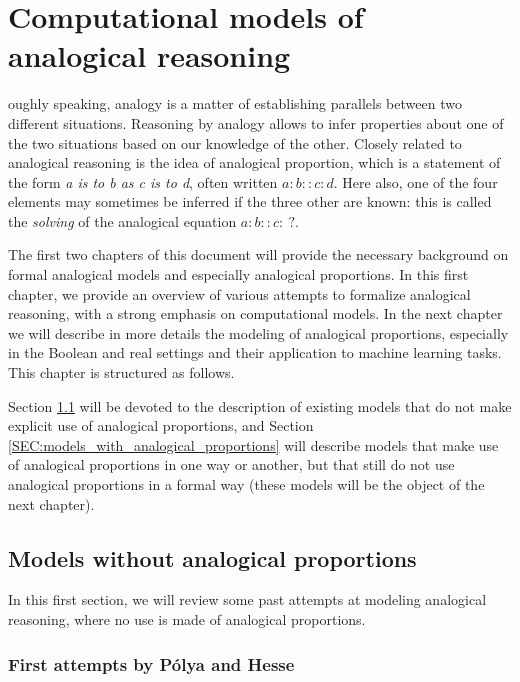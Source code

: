 \chapter{Computational models of analogical reasoning}
\label{CHAP:computational_models_of_analogical_reasoning}
\renewcommand{\contentsname}{Content}
\localtableofcontents*
\vspace*{\baselineskip}

oughly speaking, analogy is a matter of establishing parallels
between two different situations. Reasoning by analogy allows to infer
properties about one of the two situations based on our knowledge of the other.
Closely related to analogical reasoning is the idea of analogical proportion,
which is a statement of the form \textit{a is to b as c is to d}, often written
$a:b::c:d$. Here also, one of the four elements may sometimes be inferred if
the three other are known: this is called the \textit{solving} of the
analogical equation $a:b::c:~?$.

The first two chapters of this document will provide the necessary background
on formal analogical models and especially analogical proportions. In this
first chapter, we provide an overview of various attempts to formalize
analogical reasoning, with a strong emphasis on computational models. In the
next chapter we will describe in more details the modeling of analogical
proportions, especially in the Boolean and real settings and their application
to machine learning tasks. This chapter is structured as follows.

Section \ref{SEC:models_without_proportions} will be devoted to the description
of existing models that do not make explicit use of analogical proportions, and
Section \ref{SEC:models_with_analogical_proportions} will describe models that
make use of analogical proportions in one way or another, but that still do not
use analogical proportions in a formal way (these models will be the object of
the next chapter).

\section{Models without analogical proportions}
\label{SEC:models_without_proportions}

In this first section, we will review some past attempts at modeling analogical
reasoning, where no use is made of analogical proportions.

\subsection{First attempts by P\'olya and Hesse}


